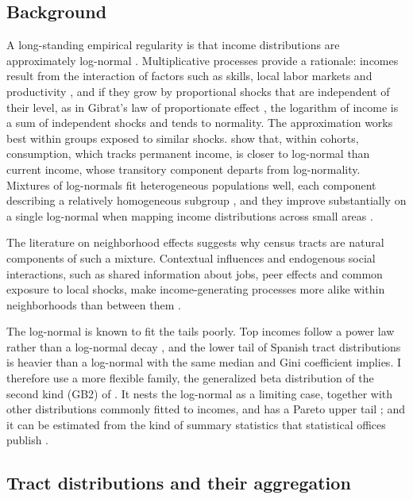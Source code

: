 
\subsection{Background}

A long-standing empirical regularity is that income distributions are approximately log-normal \citep{aitchison1957lognormal}. Multiplicative processes provide a rationale: incomes result from the interaction of factors such as skills, local labor markets and productivity \citep{neal2000theories}, and if they grow by proportional shocks that are independent of their level, as in Gibrat's law of proportionate effect \citep{gibrat1931inegalites}, the logarithm of income is a sum of independent shocks and tends to normality. The approximation works best within groups exposed to similar shocks. \citet{battistin2009consumption} show that, within cohorts, consumption, which tracks permanent income, is closer to log-normal than current income, whose transitory component departs from log-normality. Mixtures of log-normals fit heterogeneous populations well, each component describing a relatively homogeneous subgroup \citep{flachaire2007, lubrano2016}, and they improve substantially on a single log-normal when mapping income distributions across small areas \citep{gardini2022}.

The literature on neighborhood effects suggests why census tracts are natural components of such a mixture. Contextual influences and endogenous social interactions, such as shared information about jobs, peer effects and common exposure to local shocks, make income-generating processes more alike within neighborhoods than between them \citep{manski1993identification, durlauf1996neighborhoods, durlauf2004neighborhood}.

The log-normal is known to fit the tails poorly. Top incomes follow a power law rather than a log-normal decay \citep{pareto1896cours, atkinson2011top, gabaix2016power}, and the lower tail of Spanish tract distributions is heavier than a log-normal with the same median and Gini coefficient implies. I therefore use a more flexible family, the generalized beta distribution of the second kind (GB2) of \citet{mcdonald1984some}. It nests the log-normal as a limiting case, together with other distributions commonly fitted to incomes, and has a Pareto upper tail \citep{kleiber2003statistical}; and it can be estimated from the kind of summary statistics that statistical offices publish \citep{chotikapanich2007estimating}.

\subsection{Tract distributions and their aggregation}

